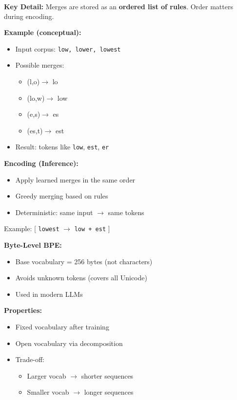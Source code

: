 \documentclass[10pt,a4paper]{article}
\begin{document}
\textbf{Key Detail:}
Merges are stored as an \textbf{ordered list of rules}. Order matters during encoding.

\textbf{Example (conceptual):}
\begin{itemize}
\item Input corpus: \texttt{low, lower, lowest}
\item Possible merges:
\begin{itemize}
\item (l,o)$\rightarrow$ lo
\item (lo,w)$\rightarrow$ low
\item (e,s)$\rightarrow$ es
\item (es,t)$\rightarrow$ est
\end{itemize}
\item Result: tokens like \texttt{low}, \texttt{est}, \texttt{er}
\end{itemize}

\textbf{Encoding (Inference):}
\begin{itemize}
\item Apply learned merges in the same order
\item Greedy merging based on rules
\item Deterministic: same input $\rightarrow$ same tokens
\end{itemize}

Example:
[
\texttt{lowest} $\rightarrow$ \texttt{low + est}
]

\textbf{Byte-Level BPE:}
\begin{itemize}
\item Base vocabulary = 256 bytes (not characters)
\item Avoids unknown tokens (covers all Unicode)
\item Used in modern LLMs
\end{itemize}

\textbf{Properties:}
\begin{itemize}
\item Fixed vocabulary after training
\item Open vocabulary via decomposition
\item Trade-off:
\begin{itemize}
\item Larger vocab $\rightarrow$ shorter sequences
\item Smaller vocab $\rightarrow$ longer sequences
\end{itemize}
\end{itemize}
\end{document}
